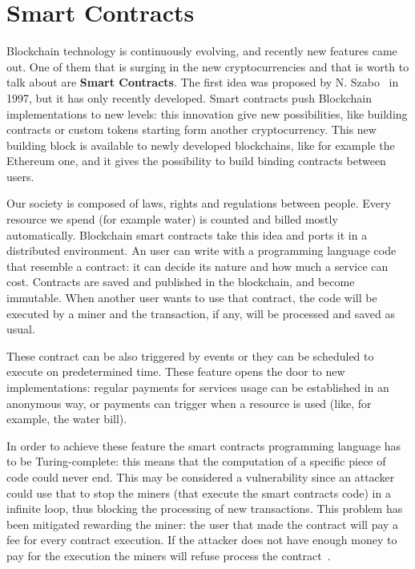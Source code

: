 \section{Smart Contracts}
\label{sec:smart_contracts}

Blockchain technology is continuously evolving, and recently new features came
out. One of them that is surging in the new cryptocurrencies and that is worth
to talk about are \textbf{Smart Contracts}.
The first idea was proposed by N. Szabo~\cite{szabo97} in 1997, but it has
only recently developed. Smart contracts push Blockchain implementations to
new levels: this innovation give new possibilities, like building contracts or
custom tokens starting form another cryptocurrency.
This new building block is available to newly developed blockchains, like for
example the Ethereum one, and it gives the possibility to build binding
contracts between users.

Our society is composed of laws, rights and regulations between people. Every
resource we spend (for example water) is counted and billed mostly
automatically.
Blockchain smart contracts take this idea and ports it in a distributed
environment.
An user can write with a programming language code that resemble a contract: it
can decide its nature and how much a service can cost. Contracts are saved and
published in the blockchain, and become immutable.
When another user wants to use that contract, the code will be executed by a
miner and the transaction, if any, will be processed and saved as usual.

These contract can be also triggered by events or they can be scheduled to
execute on predetermined time. These feature opens the door to new
implementations: regular payments for services usage can be established in an
anonymous way, or payments can trigger when a resource is used (like, for
example, the water bill).

In order to achieve these feature the smart contracts programming language has
to be Turing-complete: this means that the computation of a specific piece of
code could never end. This may be considered a vulnerability since an attacker
could use that to stop the miners (that execute the smart contracts code) in a
infinite loop, thus blocking the processing of new transactions.  This problem
has been mitigated rewarding the miner: the user that made the contract will
pay a fee for every contract execution. If the attacker does not have enough
money to pay for the execution the miners will refuse process
the contract~\cite{kosba16}.
